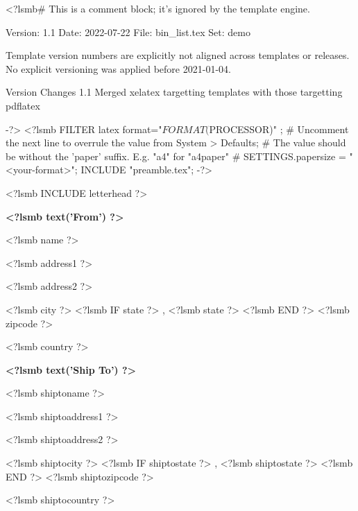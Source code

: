 <?lsmb#   This is a comment block; it's ignored by the template engine.

   Version:  1.1
   Date:     2022-07-22
   File:     bin_list.tex
   Set:      demo

Template version numbers are explicitly not aligned across templates or
releases. No explicit versioning was applied before 2021-01-04.

Version   Changes
1.1       Merged xelatex targetting templates with those targetting pdflatex

-?>
<?lsmb FILTER latex { format="$FORMAT($PROCESSOR)" };
       # Uncomment the next line to overrule the value from System > Defaults;
       # The value should be without the 'paper' suffix. E.g. "a4" for "a4paper"
       # SETTINGS.papersize = "<your-format>";
       INCLUDE "preamble.tex"; -?>



\pagestyle{myheadings}
\thispagestyle{empty}

\ifpdftex
  \fontsize{10pt}{12pt}\selectfont
\fi

<?lsmb INCLUDE letterhead ?>


%
%
%


\vspace*{0.5cm}

\parbox[t]{.5\textwidth}{
\textbf{<?lsmb text('From') ?>}
\vspace{0.3cm}

<?lsmb name ?>

<?lsmb address1 ?>

<?lsmb address2 ?>

<?lsmb city ?>
<?lsmb IF state ?>
\hspace{-0.1cm}, <?lsmb state ?>
<?lsmb END ?>
<?lsmb zipcode ?>

<?lsmb country ?>
}
\parbox[t]{.5\textwidth}{
\textbf{<?lsmb text('Ship To') ?>}
\vspace{0.3cm}

<?lsmb shiptoname ?>

<?lsmb shiptoaddress1 ?>

<?lsmb shiptoaddress2 ?>

<?lsmb shiptocity ?>
<?lsmb IF shiptostate ?>
\hspace{-0.1cm}, <?lsmb shiptostate ?>
<?lsmb END ?>
<?lsmb shiptozipcode ?>

<?lsmb shiptocountry ?>
}
\hfill

